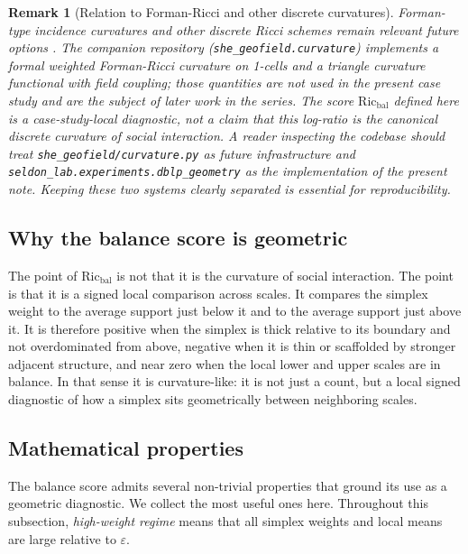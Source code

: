 \documentclass[11pt]{article}
\newtheorem{remark}[definition]{Remark}
\newcommand{\eps}{\varepsilon}
\newcommand{\Ric}{\mathrm{Ric}}
\begin{document}
\begin{remark}[Relation to Forman-Ricci and other discrete curvatures]
\label{rem:forman}
Forman-type incidence curvatures and other discrete Ricci schemes remain relevant future options \cite{WeberSaucanJost2017,SreejithMohapatraJostSaucanSamal2016,BarbarossaSardellitti2020,BacciniGeraciBianconi2022}. The companion repository (\texttt{she\_geofield.curvature}) implements a formal weighted Forman-Ricci curvature on 1-cells and a triangle curvature functional with field coupling; those quantities are \emph{not} used in the present case study and are the subject of later work in the series. The score $\Ric_{\mathrm{bal}}$ defined here is a case-study-local diagnostic, not a claim that this log-ratio is the canonical discrete curvature of social interaction. A reader inspecting the codebase should treat \texttt{she\_geofield/curvature.py} as future infrastructure and \texttt{seldon\_lab.experiments.dblp\_geometry} as the implementation of the present note. Keeping these two systems clearly separated is essential for reproducibility.
\end{remark}

\subsection{Why the balance score is geometric}

The point of $\Ric_{\mathrm{bal}}$ is not that it is the curvature of social interaction. The point is that it is a signed local comparison across scales. It compares the simplex weight to the average support just below it and to the average support just above it. It is therefore positive when the simplex is thick relative to its boundary and not overdominated from above, negative when it is thin or scaffolded by stronger adjacent structure, and near zero when the local lower and upper scales are in balance. In that sense it is curvature-like: it is not just a count, but a local signed diagnostic of how a simplex sits geometrically between neighboring scales.

\subsection{Mathematical properties}

The balance score admits several non-trivial properties that ground its use as a geometric diagnostic. We collect the most useful ones here. Throughout this subsection, \emph{high-weight regime} means that all simplex weights and local means are large relative to $\eps$.
\end{document}
